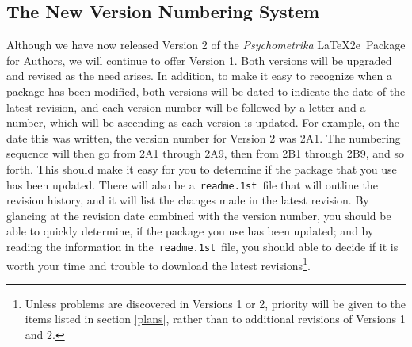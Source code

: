 \documentclass[titlepage,12pt]{article}
\begin{document}
\subsection{The New Version Numbering System}

Although we have now released Version 2 of the
\textit{Psychometrika} \LaTeX2e\ Package for Authors, we will
continue to offer Version 1. Both versions will be upgraded and
revised as the need arises. In addition, to make it easy to
recognize when a package has been modified, both versions will be
dated to indicate the date of the latest revision, and each
version number will be followed by a letter and a number, which
will be ascending as each version is updated. For example, on the
date this was written, the version number for Version 2 was 2A1.
The numbering sequence will then go from 2A1 through 2A9, then
from 2B1 through 2B9, and so forth. This should make it easy for
you to determine if the package that you use has been updated.
There will also be a~\texttt{readme.1st}~file that will outline
the revision history, and it will list the changes made in the
latest revision. By glancing at the revision date combined with
the version number, you should be able to quickly determine, if
the package you use has been updated; and by reading the
information in the~\texttt{readme.1st}~file, you should able to
decide if it is worth your time and trouble to download the latest
revisions\footnote{Unless problems are discovered in Versions 1 or
2, priority will be given to the items listed in section
\ref{plans}, rather than to additional revisions of Versions 1 and
2.}.
\end{document}
